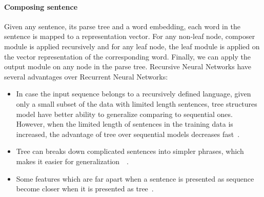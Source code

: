 \paragraph{Composing sentence}
Given any sentence, its parse tree and a word embedding, each word in the sentence is mapped to a representation vector.
For any non-leaf node, composer module is applied recursively and for any leaf node, the leaf module is applied on the vector representation of the corresponding word.
Finally, we can apply the output module on any node in the parse tree.
Recursive Neural Networks have several advantages over Recurrent Neural Networks:
\begin{itemize}
	\item In case the input sequence belongs to a recursively defined language, given only a small subset of the data with limited length sentences, tree structures model have better ability to generalize comparing to sequential ones.
	However, when the limited length of sentences in the training data is increased, the advantage of tree over sequential models decreases fast~\cite{bowman-treevslstm}.
	\item Tree can breaks down complicated sentences into simpler phrases, which makes it easier for generalization~\cite{knowledge-matter}~\cite{need-tree}.
	\item Some features which are far apart when a sentence is presented as sequence become closer when it is presented as tree~\cite{need-tree}.
\end{itemize}
